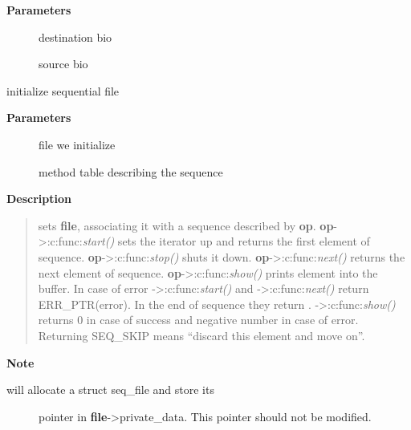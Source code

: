 \documentclass[a4paper,8pt,english]{sphinxmanual}
\begin{document}
\textbf{Parameters}
\begin{description}
\item[{}] \leavevmode
destination bio

\item[{}] \leavevmode
source bio

\end{description}

\begin{fulllineitems}
\label{filesystems/index:c.seq_open}
initialize sequential file

\end{fulllineitems}


\textbf{Parameters}
\begin{description}
\item[{}] \leavevmode
file we initialize

\item[{}] \leavevmode
method table describing the sequence

\end{description}

\textbf{Description}
\begin{quote}

{\hyperref[filesystems/index:c.seq_open]{\emph{}}} sets \textbf{file}, associating it with a sequence described
by \textbf{op}.  \textbf{op}-\textgreater{}:c:func:\emph{start()} sets the iterator up and returns the first
element of sequence. \textbf{op}-\textgreater{}:c:func:\emph{stop()} shuts it down.  \textbf{op}-\textgreater{}:c:func:\emph{next()}
returns the next element of sequence.  \textbf{op}-\textgreater{}:c:func:\emph{show()} prints element
into the buffer.  In case of error -\textgreater{}:c:func:\emph{start()} and -\textgreater{}:c:func:\emph{next()} return
ERR\_PTR(error).  In the end of sequence they return . -\textgreater{}:c:func:\emph{show()}
returns 0 in case of success and negative number in case of error.
Returning SEQ\_SKIP means ``discard this element and move on''.
\end{quote}

\textbf{Note}
\begin{description}
\item[{{\hyperref[filesystems/index:c.seq_open]{\emph{}}} will allocate a struct seq\_file and store its}] \leavevmode
pointer in \textbf{file}-\textgreater{}private\_data. This pointer should not be modified.

\end{description}
\end{document}
